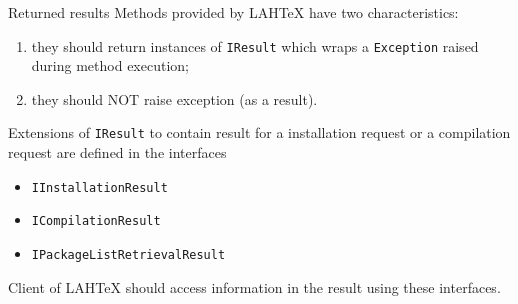 \documentclass{beamer}
\begin{document}
\begin{frame}[fragile]{Returned results}
Methods provided by LAHTeX have two characteristics: 
\begin{enumerate}
\item they should return instances of \verb/IResult/ which wraps a \verb/Exception/ raised during method execution;
\item they should NOT raise exception (as a result).
\end{enumerate}
Extensions of \verb/IResult/ to contain result for a installation request or a compilation request are defined in the interfaces
\begin{itemize}
\item \verb/IInstallationResult/
\item \verb/ICompilationResult/
\item \verb/IPackageListRetrievalResult/
\end{itemize}
Client of LAHTeX should access information in the result using these interfaces.
\end{frame}
\end{document}
